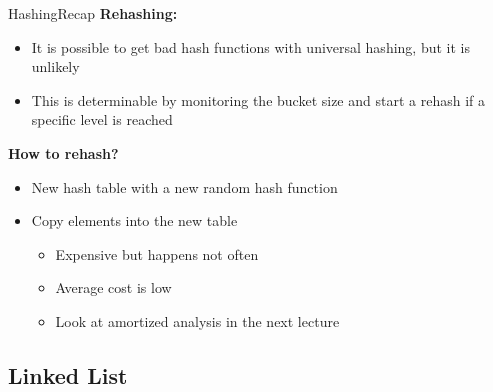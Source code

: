 \begin{frame}{Hashing}{Recap}
  \textbf{Rehashing:}
  \begin{itemize}
    \item
      It is possible to get bad hash functions with universal hashing, but it
      is unlikely
    \item
      This is determinable by monitoring the bucket size and start a rehash
      if a specific level is reached
  \end{itemize}
  \textbf{How to rehash?}
  \begin{itemize}
    \item
      New hash table with a new random hash function
    \item
      Copy elements into the new table
      \begin{itemize}
        \item
          Expensive but happens not often
        \item
          Average cost is low
        \item
          Look at amortized analysis in the next lecture
      \end{itemize}
  \end{itemize}
\end{frame}


\subsection{Linked List}

